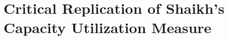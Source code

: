 %
%
%

\graphicspath{%
  {Chapter1/}%
  {Chapter1/figures/}%
  {Chapter1/appendixA/figures/}%
}


\chapter[Essay 1 \textemdash{} Critical Replication of Shaikh's Capacity Utilization Measure]%
  {Critical Replication of Shaikh's\\ Capacity Utilization Measure}

\vspace{0.8em}

